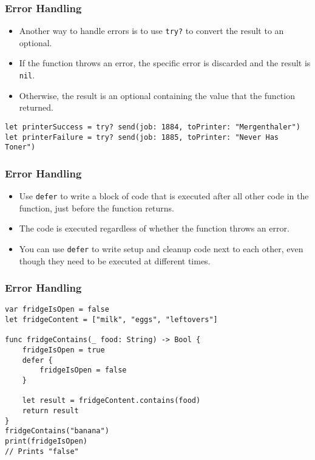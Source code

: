 \begin{frame}[fragile] \frametitle{Error Handling}

\begin{itemize}
\item Another way to handle errors is to use \lstinline|try?| to convert the result to an optional. 
\item If the function throws an error, the specific error is discarded and the result is \lstinline|nil|. 
\item Otherwise, the result is an optional containing the value that the function returned.
\end{itemize}

\begin{lstlisting}[basicstyle=\scriptsize]
let printerSuccess = try? send(job: 1884, toPrinter: "Mergenthaler")
let printerFailure = try? send(job: 1885, toPrinter: "Never Has Toner")
\end{lstlisting}
\end{frame}

\begin{frame}[fragile] \frametitle{Error Handling}

\begin{itemize}
\item Use \lstinline|defer| to write a block of code that is executed after all other code in the function, just before the function returns. 
\item The code is executed regardless of whether the function throws an error. 
\item You can use \lstinline|defer| to write setup and cleanup code next to each other, even though they need to be executed at different times.
\end{itemize}

\end{frame}

\begin{frame}[fragile] \frametitle{Error Handling}

\begin{lstlisting}[basicstyle=\scriptsize]
var fridgeIsOpen = false
let fridgeContent = ["milk", "eggs", "leftovers"]

func fridgeContains(_ food: String) -> Bool {
    fridgeIsOpen = true
    defer {
        fridgeIsOpen = false
    }

    let result = fridgeContent.contains(food)
    return result
}
fridgeContains("banana")
print(fridgeIsOpen)
// Prints "false"
\end{lstlisting}
\end{frame}

